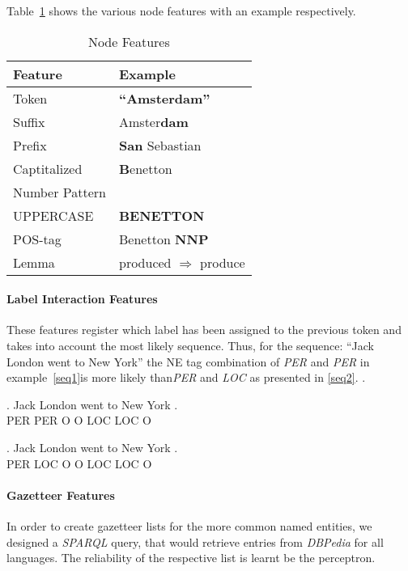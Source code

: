 \documentclass[11pt]{article}
\begin{document}
Table~\ref{table:node} shows the various node features with an example respectively.

\begin{table}[h!]
\begin{tabular}{| l | l |}
\hline
\bf Feature & \bf Example \\
\hline
Token &  \textbf{``Amsterdam''}\\
Suffix& Amster\textbf{dam}\\
Prefix&  \textbf{San} Sebastian\\
Captitalized& \textbf{B}enetton\\
Number Pattern & \\
UPPERCASE &  \textbf{BENETTON}\\
POS-tag &  Benetton \textbf{NNP}   \\
Lemma &  produced $\Rightarrow$ produce \\
\hline
\end{tabular}
\caption{Node Features}
\label{table:node}
\end{table}

\paragraph*{Label Interaction Features}
These features register which label has been assigned to the previous token and takes into account the most likely sequence. 
Thus, for the sequence: ``Jack London went to New York'' the NE tag combination of \emph{PER} and \emph{PER} in example~\ref{seq1}is more likely 
than\emph{PER} and \emph{LOC} as presented in \ref{seq2}.
.

\exg. Jack London went to New York .\\
      PER   PER   O    O  LOC LOC  O \\\label{seq1}

\exg. Jack London went to New York . \\ 
      PER  LOC    O    O  LOC LOC O \\\label{seq2}
    

\paragraph*{Gazetteer Features}
In order to create gazetteer lists for the more common named entities, we designed a \emph{SPARQL} query, that would retrieve entries from \emph{DBPedia} for all
languages. The reliability of the respective list is learnt be the perceptron. 
\end{document}
